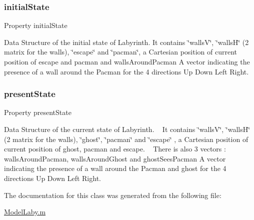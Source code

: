 \subsubsection{\texorpdfstring{initial\+State}{initialState}}
{\footnotesize\ttfamily Property initial\+State}



Data Structure of the initial state of Labyrinth. It contains \char`\"{}walls\+V\char`\"{}, \char`\"{}walls\+H\char`\"{} (2 matrix for the walls), \char`\"{}escape\char`\"{} and \char`\"{}pacman\char`\"{}, a Cartesian position of current position of escape and pacman and \textquotesingle{}walls\+Around\+Pacman\textquotesingle{} A vector indicating the presence of a wall around the Pacman for the 4 directions Up Down Left Right. 

\mbox{\label{class_model_laby_a9624cc7c421a50fa5086b0ebd0cd5fe3}} 
\subsubsection{\texorpdfstring{present\+State}{presentState}}
{\footnotesize\ttfamily Property present\+State}



Data Structure of the current state of Labyrinth. ~\newline
 It contains \char`\"{}walls\+V\char`\"{}, \char`\"{}walls\+H\char`\"{} (2 matrix for the walls), \char`\"{}ghost\char`\"{}, \char`\"{}pacman\char`\"{} and \char`\"{}escape\char`\"{} , a Cartesian position of current position of ghost, pacman and escape. ~\newline
 There is also 3 vectors \+: \textquotesingle{}walls\+Around\+Pacman\textquotesingle{}, \textquotesingle{}walls\+Around\+Ghost\textquotesingle{} and \textquotesingle{}ghost\+Sees\+Pacman\textquotesingle{} A vector indicating the presence of a wall around the Pacman and ghost for the 4 directions Up Down Left Right. 



The documentation for this class was generated from the following file\+:\begin{DoxyCompactItemize}
\item 
\hyperlink{_model_laby_8m}{Model\+Laby.\+m}\end{DoxyCompactItemize}
